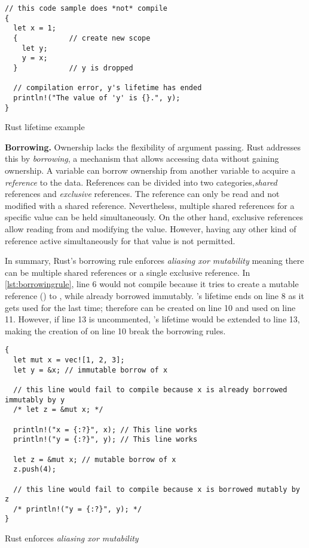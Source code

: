\begin{listing}[hbtp]
    \begin{verbatim}
// this code sample does *not* compile
{
  let x = 1;
  {            // create new scope
    let y;
    y = x;
  }            // y is dropped

  // compilation error, y's lifetime has ended
  println!("The value of 'y' is {}.", y);
}
    \end{verbatim}
    \caption{Rust lifetime example}
    \label{lst:lifetime}
    \vspace{-0.2cm}
\end{listing}

\textbf{Borrowing.}
Ownership lacks the flexibility of argument passing.
Rust addresses this by \textit{borrowing},
a mechanism that allows accessing data without gaining ownership.
A variable can borrow ownership from another variable to acquire a
\textit{reference} to the data. References can be divided into two categories,\textit{shared}
references and \textit{exclusive} references. The reference can only be read
and not modified with a shared reference. Nevertheless, multiple shared
references for a specific value can be held simultaneously.
On the other hand, exclusive references allow reading from and modifying the
value. However, having any other kind of reference active simultaneously for
that value is not permitted.

In summary, Rust's borrowing rule enforces \textit{aliasing xor mutability}
meaning there can be multiple shared references or a single exclusive
reference.
In \autoref{lst:borrowingrule}, line 6 would not compile because it tries to create
a mutable reference () to , while  already borrowed
 immutably. 's lifetime ends on line 8 as it gets used for the
last time; therefore  can be created on line 10 and used on line 11.
However, if line 13 is uncommented, 's lifetime would be extended to
line 13, making the creation of  on line 10 break the borrowing rules.

\begin{listing}[hbtp]
    \begin{verbatim}
{
  let mut x = vec![1, 2, 3];
  let y = &x; // immutable borrow of x

  // this line would fail to compile because x is already borrowed immutably by y
  /* let z = &mut x; */

  println!("x = {:?}", x); // This line works
  println!("y = {:?}", y); // This line works

  let z = &mut x; // mutable borrow of x
  z.push(4);

  // this line would fail to compile because x is borrowed mutably by z
  /* println!("y = {:?}", y); */
}
    \end{verbatim}
    \caption{Rust enforces \textit{aliasing xor mutability}}
    \label{lst:borrowingrule}
    \vspace{-0.2cm}
\end{listing}

